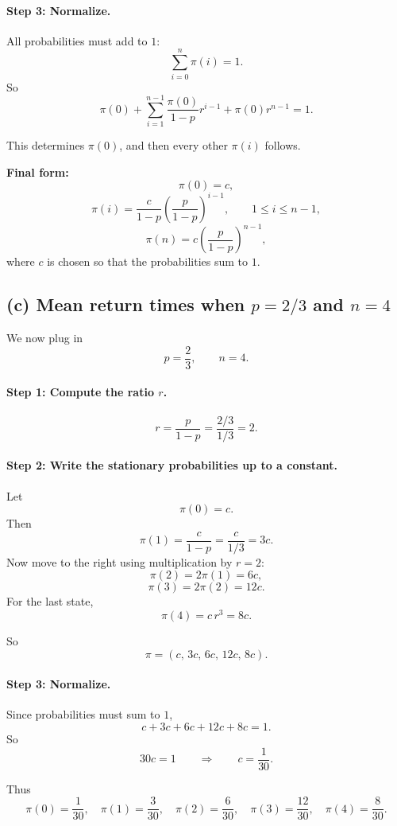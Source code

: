 \documentclass[11pt]{article}
\begin{document}
\paragraph{Step 3: Normalize.}

All probabilities must add to $1$:
\[
\sum_{i=0}^n \pi(i)=1.
\]
So
\[
\pi(0)+\sum_{i=1}^{n-1}\frac{\pi(0)}{1-p}r^{i-1}+\pi(0)r^{n-1}=1.
\]

This determines $\pi(0)$, and then every other $\pi(i)$ follows.

\bigskip
\noindent
\textbf{Final form:}
\[
\pi(0)=c,
\]
\[
\pi(i)=\frac{c}{1-p}\left(\frac{p}{1-p}\right)^{i-1}, \qquad 1\le i\le n-1,
\]
\[
\pi(n)=c\left(\frac{p}{1-p}\right)^{n-1},
\]
where $c$ is chosen so that the probabilities sum to $1$.

\subsection*{(c) Mean return times when $p=2/3$ and $n=4$}

We now plug in
\[
p=\frac23, \qquad n=4.
\]

\paragraph{Step 1: Compute the ratio $r$.}

\[
r=\frac{p}{1-p}
=\frac{2/3}{1/3}
=2.
\]

\paragraph{Step 2: Write the stationary probabilities up to a constant.}

Let
\[
\pi(0)=c.
\]
Then
\[
\pi(1)=\frac{c}{1-p}
=\frac{c}{1/3}
=3c.
\]
Now move to the right using multiplication by $r=2$:
\[
\pi(2)=2\pi(1)=6c,
\]
\[
\pi(3)=2\pi(2)=12c.
\]
For the last state,
\[
\pi(4)=c\,r^3=8c.
\]

So
\[
\pi=(c,\,3c,\,6c,\,12c,\,8c).
\]

\paragraph{Step 3: Normalize.}

Since probabilities must sum to $1$,
\[
c+3c+6c+12c+8c=1.
\]
So
\[
30c=1
\qquad \Longrightarrow \qquad
c=\frac{1}{30}.
\]

Thus
\[
\pi(0)=\frac{1}{30},\quad
\pi(1)=\frac{3}{30},\quad
\pi(2)=\frac{6}{30},\quad
\pi(3)=\frac{12}{30},\quad
\pi(4)=\frac{8}{30}.
\]
\end{document}
